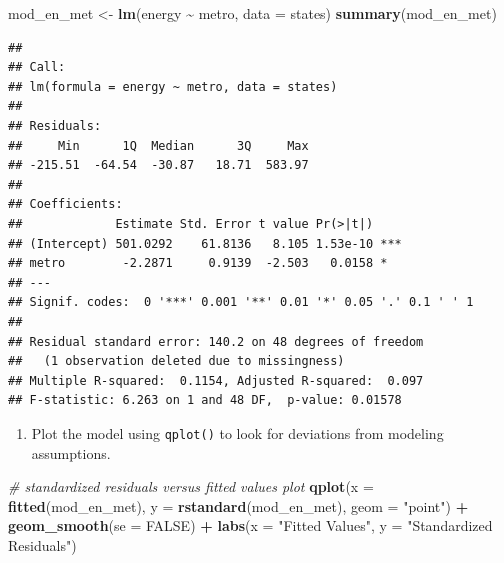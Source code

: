 \documentclass[
]{book}
\newenvironment{Shaded}{\begin{snugshade}}{\end{snugshade}}
\newcommand{\CommentTok}[1]{\textcolor[rgb]{0.56,0.35,0.01}{\textit{#1}}}
\newcommand{\DataTypeTok}[1]{\textcolor[rgb]{0.13,0.29,0.53}{#1}}
\newcommand{\KeywordTok}[1]{\textcolor[rgb]{0.13,0.29,0.53}{\textbf{#1}}}
\newcommand{\NormalTok}[1]{#1}
\newcommand{\OperatorTok}[1]{\textcolor[rgb]{0.81,0.36,0.00}{\textbf{#1}}}
\newcommand{\OtherTok}[1]{\textcolor[rgb]{0.56,0.35,0.01}{#1}}
\newcommand{\StringTok}[1]{\textcolor[rgb]{0.31,0.60,0.02}{#1}}
\providecommand{\tightlist}{%
  \setlength{\itemsep}{0pt}\setlength{\parskip}{0pt}}
\begin{document}
\begin{Shaded}
\begin{Highlighting}[]
\NormalTok{  mod\_en\_met \textless{}{-}}\StringTok{ }\KeywordTok{lm}\NormalTok{(energy }\OperatorTok{\textasciitilde{}}\StringTok{ }\NormalTok{metro, }\DataTypeTok{data =}\NormalTok{ states)}
  \KeywordTok{summary}\NormalTok{(mod\_en\_met)}
\end{Highlighting}
\end{Shaded}

\begin{verbatim}
## 
## Call:
## lm(formula = energy ~ metro, data = states)
## 
## Residuals:
##     Min      1Q  Median      3Q     Max 
## -215.51  -64.54  -30.87   18.71  583.97 
## 
## Coefficients:
##             Estimate Std. Error t value Pr(>|t|)    
## (Intercept) 501.0292    61.8136   8.105 1.53e-10 ***
## metro        -2.2871     0.9139  -2.503   0.0158 *  
## ---
## Signif. codes:  0 '***' 0.001 '**' 0.01 '*' 0.05 '.' 0.1 ' ' 1
## 
## Residual standard error: 140.2 on 48 degrees of freedom
##   (1 observation deleted due to missingness)
## Multiple R-squared:  0.1154, Adjusted R-squared:  0.097 
## F-statistic: 6.263 on 1 and 48 DF,  p-value: 0.01578
\end{verbatim}

\begin{enumerate}
\def\labelenumi{\arabic{enumi}.}
\setcounter{enumi}{2}
\tightlist
\item
  Plot the model using \texttt{qplot()} to look for deviations from modeling assumptions.
\end{enumerate}

\begin{Shaded}
\begin{Highlighting}[]
    \CommentTok{\# standardized residuals versus fitted values plot}
  \KeywordTok{qplot}\NormalTok{(}\DataTypeTok{x =} \KeywordTok{fitted}\NormalTok{(mod\_en\_met), }\DataTypeTok{y =} \KeywordTok{rstandard}\NormalTok{(mod\_en\_met), }\DataTypeTok{geom =} \StringTok{"point"}\NormalTok{) }\OperatorTok{+}
\StringTok{      }\KeywordTok{geom\_smooth}\NormalTok{(}\DataTypeTok{se =} \OtherTok{FALSE}\NormalTok{) }\OperatorTok{+}
\StringTok{      }\KeywordTok{labs}\NormalTok{(}\DataTypeTok{x =} \StringTok{"Fitted Values"}\NormalTok{, }\DataTypeTok{y =} \StringTok{"Standardized Residuals"}\NormalTok{)}
\end{Highlighting}
\end{Shaded}
\end{document}
